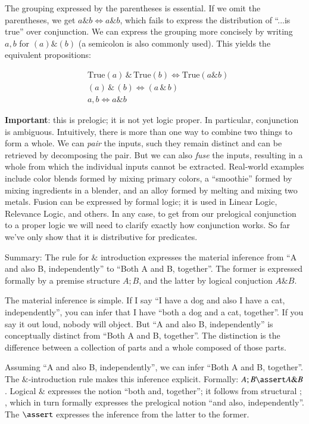 \documentclass{article}
\begin{document}
The grouping expressed by the parentheses is essential. If we omit the
parentheses, we get \(a\& b\iff a\&b\), which fails to express the
distribution of ``...is true'' over conjunction. We can express the
grouping more concisely by writing \(a,b\) for \((a)\&(b)\) (a
semicolon is also commonly used). This yields the equivalent
propositions:

\begin{align}
  & \text{True}(a)\,\&\,\text{True}(b)\iff \text{True}(a\&b) \\
  & (a)\,\&\,(b)\iff (a\,\&\,b) \\
  & a,b\iff a\&b
\end{align}

\textbf{Important}: this is prelogic; it is not yet logic proper. In
particular, conjunction is ambiguous. Intuitively, there is more than
one way to combine two things to form a whole. We can \textit{pair}
the inputs, such they remain distinct and can be retrieved by
decomposing the pair. But we can also \textit{fuse} the inputs,
resulting in a whole from which the individual inputs cannot be
extracted. Real-world examples include color blends formed by mixing
primary colors, a ``smoothie'' formed by mixing ingredients in a
blender, and an alloy formed by melting and mixing two metals. Fusion
can be expressed by formal logic; it is used in Linear Logic,
Relevance Logic, and others. In any case, to get from our prelogical
conjunction to a proper logic we will need to clarify exactly how
conjunction works. So far we've only show that it is distributive for
predicates.

Summary: The rule for \(\&\) introduction expresses the material
inference from ``A and also B, independently'' to ``Both A and B,
together''. The former is expressed formally by a premise structure
\(A ; B\), and the latter by logical conjuction \(A \& B\).

The material inference is simple. If I say ``I have a dog and also I
have a cat, independently'', you can infer that I have ``both a dog and a
cat, together''. If you say it out loud, nobody will object. But ``A
and also B, independently'' is conceptually distinct from ``Both A and B,
together''. The distinction is the difference between a collection of
parts and a whole composed of those parts.

Assuming ``A and also B, independently'', we can infer ``Both A and B,
together''. The \(\&\)-introduction rule makes this inference
explicit. Formally: \(A ; B \linfer A \& B\). Logical \(\&\)
expresses the notion ``both and, together''; it follows from
structural \(;\), which in turn formally expresses the prelogical
notion ``and also, independently''. The \(\linfer\) expresses the inference
from the latter to the former.
\end{document}
